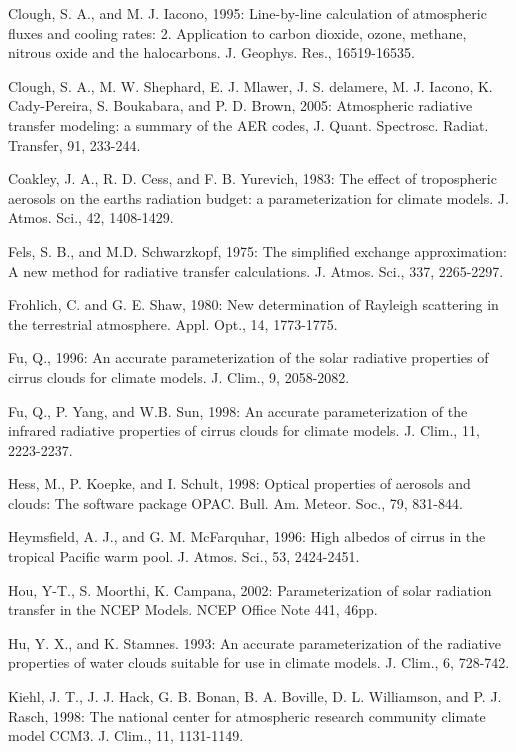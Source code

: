 Clough, S. A., and M. J. Iacono, 1995\+: Line-\/by-\/line calculation of atmospheric fluxes and cooling rates\+: 2. Application to carbon dioxide, ozone, methane, nitrous oxide and the halocarbons. J. Geophys. Res., 16519-\/16535.

Clough, S. A., M. W. Shephard, E. J. Mlawer, J. S. delamere, M. J. Iacono, K. Cady-\/\+Pereira, S. Boukabara, and P. D. Brown, 2005\+: Atmospheric radiative transfer modeling\+: a summary of the A\+ER codes, J. Quant. Spectrosc. Radiat. Transfer, 91, 233-\/244.

Coakley, J. A., R. D. Cess, and F. B. Yurevich, 1983\+: The effect of tropospheric aerosols on the earth\textquotesingle{}s radiation budget\+: a parameterization for climate models. J. Atmos. Sci., 42, 1408-\/1429.

Fels, S. B., and M.\+D. Schwarzkopf, 1975\+: The simplified exchange approximation\+: A new method for radiative transfer calculations. J. Atmos. Sci., 337, 2265-\/2297.

Frohlich, C. and G. E. Shaw, 1980\+: New determination of Rayleigh scattering in the terrestrial atmosphere. Appl. Opt., 14, 1773-\/1775.

Fu, Q., 1996\+: An accurate parameterization of the solar radiative properties of cirrus clouds for climate models. J. Clim., 9, 2058-\/2082.

Fu, Q., P. Yang, and W.\+B. Sun, 1998\+: An accurate parameterization of the infrared radiative properties of cirrus clouds for climate models. J. Clim., 11, 2223-\/2237.

Hess, M., P. Koepke, and I. Schult, 1998\+: Optical properties of aerosols and clouds\+: The software package O\+P\+AC. Bull. Am. Meteor. Soc., 79, 831-\/844.

Heymsfield, A. J., and G. M. Mc\+Farquhar, 1996\+: High albedos of cirrus in the tropical Pacific warm pool. J. Atmos. Sci., 53, 2424-\/2451.

Hou, Y-\/T., S. Moorthi, K. Campana, 2002\+: Parameterization of solar radiation transfer in the N\+C\+EP Models. N\+C\+EP Office Note 441, 46pp.

Hu, Y. X., and K. Stamnes. 1993\+: An accurate parameterization of the radiative properties of water clouds suitable for use in climate models. J. Clim., 6, 728-\/742.

Kiehl, J. T., J. J. Hack, G. B. Bonan, B. A. Boville, D. L. Williamson, and P. J. Rasch, 1998\+: The national center for atmospheric research community climate model C\+C\+M3. J. Clim., 11, 1131-\/1149.

